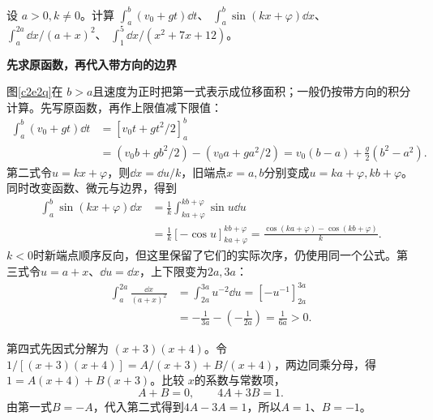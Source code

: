 \begin{question}
\begin{example}[带边界的积分]
设 $a>0,k\ne0$。计算
$\int_a^b(v_0+gt)\dd t$、
$\int_a^b\sin(kx+\varphi)\dd x$、
$\int_a^{2a}\dd x/(a+x)^2$、
$\int_1^5\dd x/(x^2+7x+12)$。
\end{example}
\end{question}
\begin{solution}\textbf{先求原函数，再代入带方向的边界}\par\nobreak
图\ref{c2e2q}在 $b>a$且速度为正时把第一式表示成位移面积；一般仍按带方向的积分计算。先写原函数，再作上限值减下限值：
\begin{align*}
\int_a^b(v_0+gt)\dd t
 &=[v_0t+gt^2/2]_a^b\\
 &=(v_0b+gb^2/2)-(v_0a+ga^2/2)
 =v_0(b-a)+\frac g2(b^2-a^2).
\end{align*}
第二式令$u=kx+\varphi$，则$\dd x=\dd u/k$，旧端点$x=a,b$分别变成$u=ka+\varphi,kb+\varphi$。同时改变函数、微元与边界，得到
\begin{align*}
\int_a^b\sin(kx+\varphi)\dd x
&=\frac1k\int_{ka+\varphi}^{kb+\varphi}\sin u\dd u\\
&=\frac1k[-\cos u]_{ka+\varphi}^{kb+\varphi}
=\frac{\cos(ka+\varphi)-\cos(kb+\varphi)}k.
\end{align*}
$k<0$时新端点顺序反向，但这里保留了它们的实际次序，仍使用同一个公式。第三式令$u=a+x$、$\dd u=\dd x$，上下限变为$2a,3a$：
\begin{align*}
\int_a^{2a}\frac{\dd x}{(a+x)^2}
&=\int_{2a}^{3a}u^{-2}\dd u
=[-u^{-1}]_{2a}^{3a}\\
&=-\frac1{3a}-\left(-\frac1{2a}\right)=\frac1{6a}>0.
\end{align*}

第四式先因式分解为 $(x+3)(x+4)$。令
$1/[(x+3)(x+4)]=A/(x+3)+B/(x+4)$，两边同乘分母，得
$1=A(x+4)+B(x+3)$。比较 $x$的系数与常数项，
\[A+B=0,\qquad4A+3B=1.\]
由第一式$B=-A$，代入第二式得到$4A-3A=1$，所以$A=1$、$B=-1$。




\end{solution}
